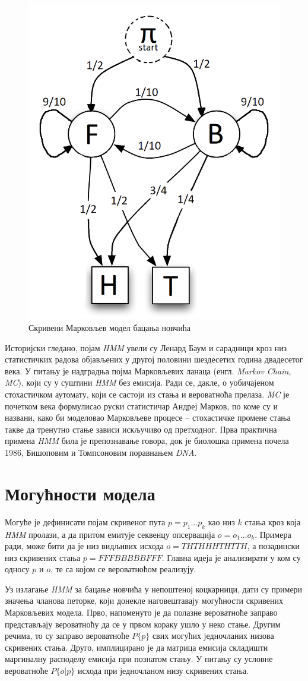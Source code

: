\documentclass[12pt,oneside]{memoir}
\begin{document}
\begin{CJK}{UTF8}{ipxm}
\begin{figure}[H]
  \centering
  \includegraphics[width=.5\textwidth]{kockarnica.png}
  \caption{Скривени Марковљев модел бацања новчића}
  \label{fig:kock}
\end{figure}

Историјски гледано, појам \textit{HMM} увели су Ленард Баум и сарадници кроз низ статистичких радова објављених у другој половини шездесетих година двадесетог века\cite{baum1966}. У питању је надградња појма Марковљевих ланаца (енгл. \textit{Markov Chain, MC}), који су у суштини \textit{HMM} без емисија. Ради се, дакле, о уобичајеном стохастичком аутомату, који се састоји из стања и вероватноћа прелаза. \textit{MC} је почетком века формулисао руски статистичар Андреј Марков, по коме су и названи, како би моделовао Марковљеве процесе -- стохастичке промене стања такве да тренутно стање зависи искључиво од претходног\cite{markov1906}. Прва практична примена \textit{HMM} била је препознавање говора, док је биолошка примена почела 1986, Бишоповим и Томпсоновим поравнањем \textit{DNA}\cite{bishop1986}.

\section{Могућности модела}
Могуће је дефинисати појам скривеног пута $p = p_1...p_k$ као низ $k$ стања кроз која \textit{HMM} пролази, а да притом емитује секвенцу опсервација $o = o_1...o_k$. Примера ради, може бити да је низ видљивих исхода $o = THTHHHTHTTH$, а позадински низ скривених стања $p = FFFBBBBBFFF$. Главна идеја је анализирати у ком су односу $p$ и $o$, те са којом се вероватноћом реализују.

Уз излагање \textit{HMM} за бацање новчића у непоштеној коцкарници, дати су примери значења чланова петорке, који донекле наговештавају могућности скривених Марковљевих модела. Прво, напоменуто је да полазне вероватноће заправо представљају вероватноћу да се у првом кораку ушло у неко стање. Другим речима, то су заправо вероватноће $P\{p\}$ свих могућих једночланих низова скривених стања. Друго, имплицирано је да матрица емисија складишти маргиналну расподелу емисија при познатом стању. У питању су условне вероватноће $P\{o | p\}$ исхода при једночланом низу скривених стања.


\end{CJK}
\end{document}
